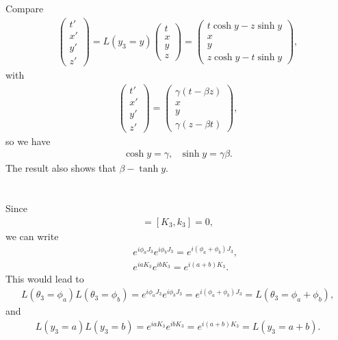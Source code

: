 \documentclass[11pt]{article}
\begin{document}
\section{ }
Compare
\begin{eqnarray}
    \begin{pmatrix}
      t' \\ x' \\ y' \\ z'
    \end{pmatrix}
    = L(y_3=y)
    \begin{pmatrix}
      t \\ x \\ y \\ z
    \end{pmatrix}
    =
    \begin{pmatrix}
      t\cosh y -z\sinh y \\ x \\ y \\ z\cosh y -t\sinh y
    \end{pmatrix},
  \end{eqnarray}
with
\begin{eqnarray}
    \begin{pmatrix}
      t' \\ x' \\ y' \\ z'
    \end{pmatrix}
    =
    \begin{pmatrix}
     \gamma (t-\beta z) \\ x \\ y \\ \gamma (z-\beta t)
    \end{pmatrix},
\end{eqnarray}
so we have
\begin{eqnarray}
    \cosh y=\gamma, ~~~\sinh y = \gamma \beta.
\end{eqnarray}
The result also shows that $\beta -\tanh y $.

\section{ }
Since
\begin{eqnarray}
    [J_3,J_3]=[K_3,k_3]=0,
\end{eqnarray}
we can write
\begin{eqnarray}
    &&e^{ i\phi_a J_3 } e^{ i\phi_b J_3 }
   = e^{ i(\phi_a+\phi_b) J_3 },\\
    &&e^{ i a K_3 } e^{ i b K_3 }
  = e^{ i (a+b) K_3 }.
\end{eqnarray}
This would lead to
\begin{eqnarray}
    L(\theta_3=\phi_a) L(\theta_3=\phi_b)
     = e^{ i\phi_a J_3 } e^{ i\phi_b J_3 }
     = e^{ i(\phi_a+\phi_b) J_3 }
     = L(\theta_3 = \phi_a + \phi_b ),
  \end{eqnarray}
   and
  \begin{eqnarray}
    L(y_3 = a) L(y_3 = b)
    = e^{ i a K_3 } e^{ i b K_3 }
    = e^{ i (a+b) K_3 }
    = L(y_3 = a+b ) .
  \end{eqnarray}
\end{document}
